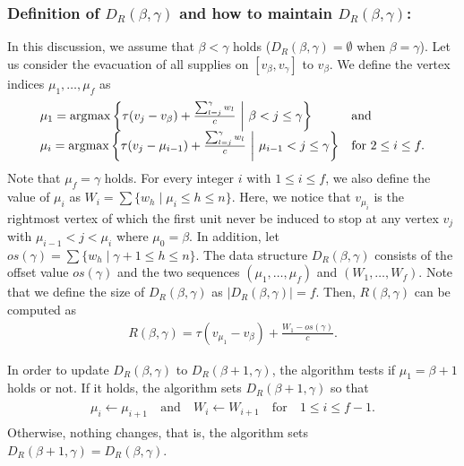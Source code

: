 \documentclass[a4paper]{llncs}
\newcommand{\argmax}{\operatornamewithlimits{argmax}}
\begin{document}
\subsubsection{Definition of $D_R(\beta, \gamma)$ and how to maintain $D_R(\beta, \gamma)$:} 
In this discussion, we assume that $\beta < \gamma$ holds ($D_R(\beta, \gamma) = \emptyset$ when $\beta = \gamma$).
Let us consider the evacuation of all supplies on $[v_\beta, v_\gamma]$ to $v_\beta$.
We define the vertex indices $\mu_1, \ldots, \mu_f$ as
\begin{eqnarray}
\begin{array}{ll}
	\mu_1 = \argmax \left\{ \tau(v_j - v_\beta) + \frac{\sum_{l=j}^\gamma w_l}{c} \ \bigg| \ \beta < j \le \gamma \right\}			 	& \mbox{and} \\
	\mu_i = \argmax \left\{ \tau(v_j - \mu_{i-1}) + \frac{\sum_{l=j}^\gamma w_l}{c} \ \bigg| \ \mu_{i-1} < j \le \gamma \right\}	& \mbox{for} \ 2 \le i \le f.
    \end{array}
 \label{eq20}
\end{eqnarray}
Note that $\mu_f = \gamma$ holds. 
For every integer $i$ with $1 \le i \le f$, we also define the value of $\mu_i$ as $W_i = \sum \{ w_h \mid \mu_i \le h \le n\}$.
Here, we notice that $v_{\mu_i}$ is the rightmost vertex of which the first unit never be induced to stop at any vertex $v_j$ with $\mu_{i-1} < j < \mu_i$ where $\mu_0 = \beta$.
In addition, let $os(\gamma) = \sum \{ w_h \mid \gamma+1 \le h \le n\}$.
The data structure $D_R(\beta, \gamma)$ consists of the offset value $os(\gamma)$ and the two sequences $(\mu_1, \ldots, \mu_f)$ and $(W_1, \ldots, W_f)$.
Note that we define the size of $D_R(\beta, \gamma)$ as $|D_R(\beta, \gamma)| = f$.
Then, $R(\beta, \gamma)$ can be computed as 
\begin{eqnarray}
R(\beta, \gamma) =  \tau(v_{\mu_1} - v_\beta) + \frac{W_1 - os(\gamma)}{c}.
\label{eq21}
\end{eqnarray}

In order to update $D_R(\beta, \gamma)$ to $D_R(\beta+1, \gamma)$, the algorithm tests if $\mu_1 = \beta+1$ holds or not. 
If it holds, the algorithm sets $D_R(\beta+1, \gamma)$ so that
\begin{eqnarray}
    \begin{array}{lllll}
	\mu_i \leftarrow \mu_{i+1} \	& \mbox{and} \ & W_i \leftarrow W_{i+1} \				& \mbox{for} \ & 1 \le i \le f-1.
    \end{array}
    \label{eq22}
\end{eqnarray}
Otherwise, nothing changes, that is, the algorithm sets $D_R(\beta+1, \gamma) = D_R(\beta, \gamma)$.
\end{document}
